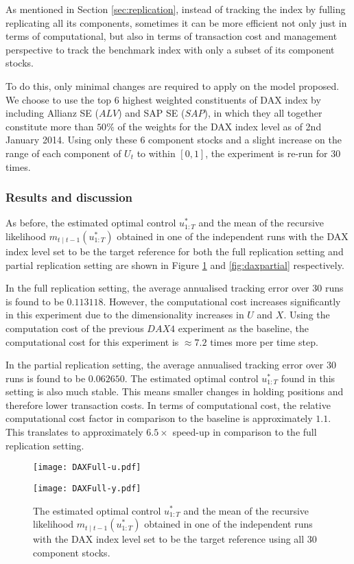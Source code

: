 As mentioned in Section \ref{sec:replication}, instead of tracking the index by fulling replicating all its components, sometimes it can be more efficient not only just in terms of computational, but also in terms of transaction cost and management perspective to track the benchmark index with only a subset of its component stocks.

To do this, only minimal changes are required to apply on the model proposed. We choose to use the top $6$ highest weighted constituents of DAX index by including Allianz SE ($ALV$) and SAP SE ($SAP$), in which they all together constitute more than $50\%$ of the weights for the DAX index level as of 2nd January 2014. Using only these $6$ component stocks and a slight increase on the range of each component of $U_t$ to within $[0,1]$, the experiment is re-run for $30$ times.

\subsubsection{Results and discussion}
As before, the estimated optimal control $u^*_{1:T}$ and the mean of the recursive likelihood $m_{t \mid t-1}(u^*_{1:T})$ obtained in one of the independent runs with the DAX index level set to be the target reference for both the full replication setting and partial replication setting are shown in Figure \ref{fig:dax} and \ref{fig:daxpartial} respectively.

In the full replication setting, the average annualised tracking error over $30$ runs is found to be $0.113118$. However, the computational cost increases significantly in this experiment due to the dimensionality increases in $U$ and $X$. Using the computation cost of the previous $DAX4$ experiment as the baseline, the computational cost for this experiment is $\approx 7.2$ times more per time step.

In the partial replication setting, the average annualised tracking error over $30$ runs is found to be $0.062650$. The estimated optimal control $u^*_{1:T}$ found in this setting is also much stable. This means smaller changes in holding positions and therefore lower transaction costs. In terms of computational cost, the relative computational cost factor in comparison to the baseline is approximately $1.1$. This translates to approximately $6.5\times$ speed-up in comparison to the full replication setting.

\begin{figure}[htbp]
\centering
    \begin{minipage}{0.5\textwidth}
        \centering
        \texttt{[image: DAXFull-u.pdf]}
    \end{minipage}%
    \begin{minipage}{0.5\textwidth}
        \centering
        \texttt{[image: DAXFull-y.pdf]}
    \end{minipage}
\caption{The estimated optimal control $u^*_{1:T}$ and the mean of the recursive likelihood $m_{t \mid t-1}(u^*_{1:T})$ obtained in one of the independent runs with the DAX index level set to be the target reference using all $30$ component stocks.}
\label{fig:dax}
\end{figure}

